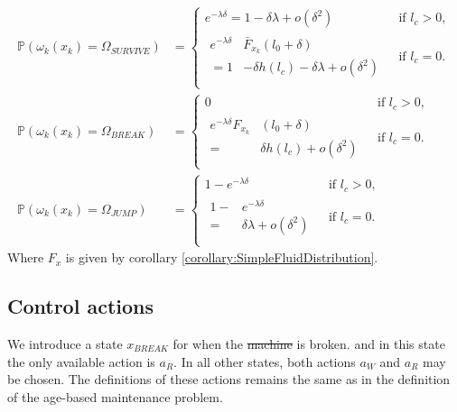 \documentclass[a4paper]{thesis}
\theoremstyle{definition}
\providecommand{\DIFaddtex}[1]{{\protect\color{blue}\uwave{#1}}} %
\providecommand{\DIFdeltex}[1]{{\protect\color{red}\sout{#1}}}                      %
\providecommand{\DIFaddbegin}{} %
\providecommand{\DIFaddend}{} %
\providecommand{\DIFdelbegin}{} %
\providecommand{\DIFdelend}{} %
\providecommand{\DIFadd}[1]{\texorpdfstring{\DIFaddtex{#1}}{#1}} %
\providecommand{\DIFdel}[1]{\texorpdfstring{\DIFdeltex{#1}}{}} %
\newcommand{\DIFscaledelfig}{0.5}
\newlength{\DIFdelgraphicswidth} %
\newlength{\DIFdelgraphicsheight} %
\newcommand{\DIFaddincludegraphics}[2][]{{\color{blue}\fbox{\DIFOincludegraphics[#1]{#2}}}} %
\newcommand{\DIFdelincludegraphics}[2][]{%
	\sbox{\DIFdelgraphicsbox}{\DIFOincludegraphics[#1]{#2}}%
	\settoboxwidth{\DIFdelgraphicswidth}{\DIFdelgraphicsbox} %
	\settoboxtotalheight{\DIFdelgraphicsheight}{\DIFdelgraphicsbox} %
	\scalebox{\DIFscaledelfig}{%
		\parbox[b]{\DIFdelgraphicswidth}{\usebox{\DIFdelgraphicsbox}\\[-\baselineskip] \rule{\DIFdelgraphicswidth}{0em}}\llap{\resizebox{\DIFdelgraphicswidth}{\DIFdelgraphicsheight}{%
				\setlength{\unitlength}{\DIFdelgraphicswidth}%
				\begin{picture}(1,1)%
				\thicklines\linethickness{2pt} %
				{\color[rgb]{1,0,0}\put(0,0){\framebox(1,1){}}}%
				{\color[rgb]{1,0,0}\put(0,0){\line( 1,1){1}}}%
				{\color[rgb]{1,0,0}\put(0,1){\line(1,-1){1}}}%
				\end{picture}%
			}\hspace*{3pt}}} %
} %
\DeclareRobustCommand{\DIFaddbegin}{\DIFOaddbegin \let\includegraphics\DIFaddincludegraphics} %
\DeclareRobustCommand{\DIFaddend}{\DIFOaddend \let\includegraphics\DIFOincludegraphics} %
\DeclareRobustCommand{\DIFdelbegin}{\DIFOdelbegin \let\includegraphics\DIFdelincludegraphics} %
\DeclareRobustCommand{\DIFdelend}{\DIFOaddend \let\includegraphics\DIFOincludegraphics} %
\begin{document}
	\[
	\begin{split}
	\mathbb{P}(\omega_k(x_k)=\Omega_{SURVIVE})&=\begin{cases}
	e^{-\lambda \delta}=1-\delta\lambda+o(\delta^2)&\text{ if }l_c>0,\\
	\begin{split}
	e^{-\lambda \delta} & \bar{F}_{x_k}(l_0+\delta)\\
	=1&-\delta h(l_c)-\delta\lambda+o(\delta^2)
	\end{split}&\text{ if }l_c=0.\\
	\end{cases}\\
	\mathbb{P}(\omega_k(x_k)=\Omega_{BREAK})&=\begin{cases}
	0&\text{ if }l_c>0,\\
	\begin{split}
	e^{-\lambda \delta}F_{x_k}&(l_0+\delta)\\
	=&\delta h(l_c)+o(\delta^2)
	\end{split}&\text{ if }l_c=0.\\
	\end{cases}\\
	\mathbb{P}(\omega_k(x_k)=\Omega_{JUMP})&=\begin{cases}
	1-e^{-\lambda \delta} & \text{ if }l_c>0,\\
	\begin{split}
	1-&e^{-\lambda \delta}\\
	=&\delta\lambda+o(\delta^2)
	\end{split}&\text{ if }l_c=0.\\
	\end{cases}
	\end{split}
	\]
	Where $F_x$ is given by corollary \ref{corollary:SimpleFluidDistribution}.
	
	\subsection{Control actions}
	We introduce a state $x_{BREAK}$ for when the \DIFdelbegin \DIFdel{machine }\DIFdelend \DIFaddbegin \DIFadd{asset }\DIFaddend is broken.
	and in this state the only available action is $a_R$.
	In all other states, both actions $a_W$ and $a_R$ may be chosen.
	The definitions of these actions remains the same as in the definition of the age-based maintenance problem.
	
\end{document}

